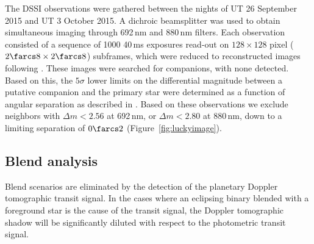 \documentclass[apjl]{emulateapj}
\begin{document}
\begin{figure*}[!ht]
{
}
\caption{
Limits on the relative magnitude of a resolved companion to HAT-P-67 as a function of angular separation based on speckle imaging observations from WIYN~3.5\,m/DSSI. The dotted lines denote the $5\sigma$ limits. The left panel shows the limits for the 692\,nm filter, the right shows limits for the 880\,nm filter. 
}
\label{fig:luckyimage}
\end{figure*}

The DSSI observations were gathered between the nights of UT 26 September 2015
and UT 3 October 2015. A dichroic beamsplitter was used to obtain
simultaneous imaging through 692\,nm and 880\,nm filters. Each
observation consisted of a sequence of 1000 40\,ms exposures read-out
on $128 \times 128$ pixel ($2\farcs8 \times 2\farcs8$) subframes,
which were reduced to reconstructed images following
\citet{horch:2011}. These images were searched for companions, with none detected. Based on this, the $5\sigma$ lower limits on the differential
magnitude between a putative companion and the primary star were
determined as a function of angular separation as described in
\citet{horch:2011}. Based on these observations we exclude neighbors with $\Delta m < 2.56$ at 692\,nm, or $\Delta m < 2.80$ at 880\,nm, down to a limiting separation of $0\farcs2$ (Figure~\ref{fig:luckyimage}).  





\subsection{Blend analysis}
\label{sec:blend}

Blend scenarios are eliminated by the detection of the planetary Doppler tomographic transit signal. In the cases where an eclipsing binary blended with a foreground star is the cause of the transit signal, the Doppler tomographic shadow will be significantly diluted with respect to the photometric transit signal. 
\end{document}
